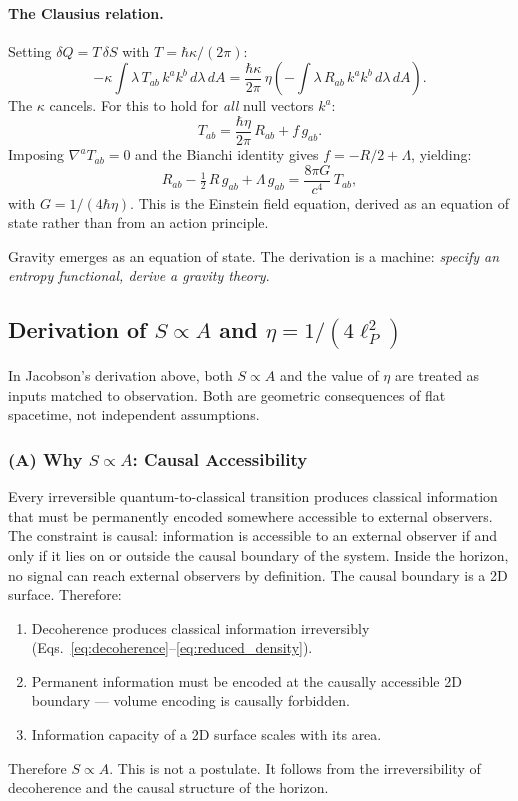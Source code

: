 \documentclass[11pt]{article}
\begin{document}
\paragraph{The Clausius relation.}
Setting $\delta Q = T\,\delta S$ with $T = \hbar\kappa/(2\pi)$:
\begin{equation}
-\kappa \int \lambda\,T_{ab}\,k^a k^b\,d\lambda\,dA
= \frac{\hbar\kappa}{2\pi}\,\eta
\left(-\int \lambda\,R_{ab}\,k^a k^b\,d\lambda\,dA\right).
\end{equation}
The $\kappa$ cancels.  For this to hold for \textit{all} null vectors $k^a$:
\begin{equation}
T_{ab} = \frac{\hbar\eta}{2\pi}\,R_{ab} + f\,g_{ab}.
\end{equation}
Imposing $\nabla^a T_{ab} = 0$ and the Bianchi identity gives
$f = -R/2 + \Lambda$, yielding:
\begin{equation}
R_{ab} - \tfrac{1}{2}\,R\,g_{ab} + \Lambda\,g_{ab}
= \frac{8\pi G}{c^4}\,T_{ab},
\label{eq:einstein}
\end{equation}
with $G = 1/(4\hbar\eta)$.  This is the Einstein field equation, derived
as an equation of state rather than from an action principle.

Gravity emerges as an equation of state.  The derivation is a machine:
\emph{specify an entropy functional, derive a gravity theory}.

\subsection{Derivation of $S \propto A$ and $\eta = 1/(4\ell_P^2)$}
\label{sec:bekenstein_derivation}

In Jacobson's derivation above, both $S \propto A$ and the value of
$\eta$ are treated as inputs matched to observation.  Both are geometric
consequences of flat spacetime, not independent assumptions.

\subsubsection*{(A) Why $S \propto A$: Causal Accessibility}

Every irreversible quantum-to-classical transition produces classical
information that must be permanently encoded somewhere accessible to
external observers.  The constraint is causal: information is accessible
to an external observer if and only if it lies on or outside the causal
boundary of the system.  Inside the horizon, no signal can reach external
observers by definition.  The causal boundary is a 2D surface.  Therefore:
\begin{enumerate}
\item Decoherence produces classical information irreversibly
  (Eqs.~\ref{eq:decoherence}--\ref{eq:reduced_density}).
\item Permanent information must be encoded at the causally accessible
  2D boundary --- volume encoding is causally forbidden.
\item Information capacity of a 2D surface scales with its area.
\end{enumerate}
Therefore $S \propto A$.  This is not a postulate.  It follows from
the irreversibility of decoherence and the causal structure of the
horizon.
\end{document}
